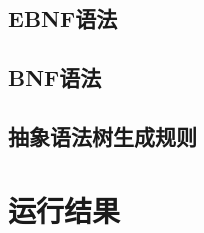 \documentclass{article}
\begin{document}
\subsection{EBNF语法}  

\subsection{BNF语法}  

\subsection{抽象语法树生成规则}


\section{运行结果} 
\end{document}
